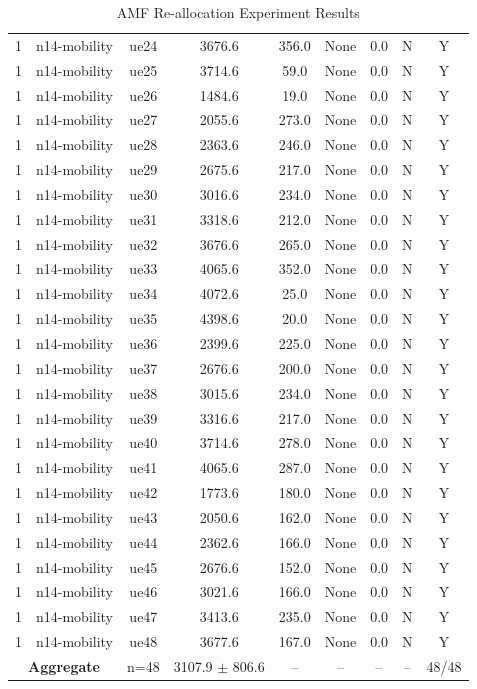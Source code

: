 \begin{table}[ht]
\begin{tabular}{|c|c|c|c|c|c|c|c|c|}
1 & n14-mobility & ue24 & 3676.6 & 356.0 & None & 0.0 & N & Y \\
1 & n14-mobility & ue25 & 3714.6 & 59.0 & None & 0.0 & N & Y \\
1 & n14-mobility & ue26 & 1484.6 & 19.0 & None & 0.0 & N & Y \\
1 & n14-mobility & ue27 & 2055.6 & 273.0 & None & 0.0 & N & Y \\
1 & n14-mobility & ue28 & 2363.6 & 246.0 & None & 0.0 & N & Y \\
1 & n14-mobility & ue29 & 2675.6 & 217.0 & None & 0.0 & N & Y \\
1 & n14-mobility & ue30 & 3016.6 & 234.0 & None & 0.0 & N & Y \\
1 & n14-mobility & ue31 & 3318.6 & 212.0 & None & 0.0 & N & Y \\
1 & n14-mobility & ue32 & 3676.6 & 265.0 & None & 0.0 & N & Y \\
1 & n14-mobility & ue33 & 4065.6 & 352.0 & None & 0.0 & N & Y \\
1 & n14-mobility & ue34 & 4072.6 & 25.0 & None & 0.0 & N & Y \\
1 & n14-mobility & ue35 & 4398.6 & 20.0 & None & 0.0 & N & Y \\
1 & n14-mobility & ue36 & 2399.6 & 225.0 & None & 0.0 & N & Y \\
1 & n14-mobility & ue37 & 2676.6 & 200.0 & None & 0.0 & N & Y \\
1 & n14-mobility & ue38 & 3015.6 & 234.0 & None & 0.0 & N & Y \\
1 & n14-mobility & ue39 & 3316.6 & 217.0 & None & 0.0 & N & Y \\
1 & n14-mobility & ue40 & 3714.6 & 278.0 & None & 0.0 & N & Y \\
1 & n14-mobility & ue41 & 4065.6 & 287.0 & None & 0.0 & N & Y \\
1 & n14-mobility & ue42 & 1773.6 & 180.0 & None & 0.0 & N & Y \\
1 & n14-mobility & ue43 & 2050.6 & 162.0 & None & 0.0 & N & Y \\
1 & n14-mobility & ue44 & 2362.6 & 166.0 & None & 0.0 & N & Y \\
1 & n14-mobility & ue45 & 2676.6 & 152.0 & None & 0.0 & N & Y \\
1 & n14-mobility & ue46 & 3021.6 & 166.0 & None & 0.0 & N & Y \\
1 & n14-mobility & ue47 & 3413.6 & 235.0 & None & 0.0 & N & Y \\
1 & n14-mobility & ue48 & 3677.6 & 167.0 & None & 0.0 & N & Y \\
\multicolumn{2}{|c|}{\textbf{Aggregate}} & n=48 & 3107.9 $\pm$ 806.6 & -- & -- & -- & -- & 48/48 \\
\hline
\end{tabular}
\caption{AMF Re-allocation Experiment Results}
\label{tab:amf_realloc}
\end{table}
